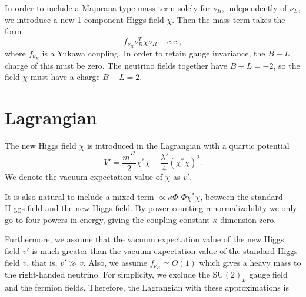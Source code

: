 \documentclass[12pt,a4paper]{article}
\begin{document}
In order to include a Majorana-type mass term solely for $\nu_R$, independently of $\nu_L$, we introduce a new 1-component Higgs field $\chi$. Then the mass term takes the form
\begin{equation}
f_{\nu_R} \nu_R^T \chi \nu_R + \text{c.c.},
\end{equation}
where $f_{\nu_R}$ is a Yukawa coupling. In order to retain gauge invariance, the $B-L$ charge of this must be zero. The neutrino fields together have $B-L = -2$, so the field $\chi$ must have a charge $B-L=2$. 

\section{Lagrangian}
The new Higgs field $\chi$ is introduced in the Lagrangian with a quartic potential $$V' = \frac{m'^{2}}{2}\chi^*\chi+\frac{\lambda'}{4}(\chi^*\chi)^2.$$ 
We denote the vacuum expectation value of $\chi$ as $v'$.

It is also natural to include a mixed term $\propto \kappa\Phi^{\dagger}\Phi\chi^*\chi$, between the standard Higgs field and the new Higgs field.  By power counting renormalizability we only go to four powers in energy, giving the coupling constant $\kappa$ dimension zero.

Furthermore, we assume that the vacuum expectation value of the new Higgs field $v'$ is much greater than the vacuum expectation value of the standard Higgs field $v$, that is, $v'\gg v$. Also, we assume  $f_{\nu_R}\simeq O(1)$ which gives a heavy mass to the right-handed neutrino. For simplicity, we exclude the SU$(2)_L$ gauge field and the fermion fields. Therefore, the Lagrangian with these approximations is 
\end{document}

